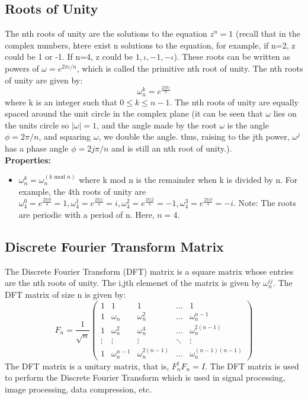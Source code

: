 \documentclass[12pt, oneside]{book}
\theoremstyle{definition}
\theoremstyle{definition}
\theoremstyle{remark}
\begin{document}
\subsection{Roots of Unity}\label{subsec:roots_of_unity}
The nth roots of unity are the solutions to the equation $z^n=1$ (recall that in the complex numbers, htere exist n solutions to the equation, for example, 
if n=2, z could be 1 or -1. If n=4, z could be $1, \iota,-1,-\iota$). These roots can be written as powers of $\omega=e^{2\pi\iota/n}$, which is called the primitive nth root of unity.
The nth roots of unity are given by:
\[ \omega^k_n=e^{\frac{2\pi k \iota}{n}} \]
where k is an integer such that $0\leq k \leq n-1$. The nth roots of unity are equally spaced around the unit circle in the complex plane (it can be seen that $\omega$ lies on the units circle so $|\omega|=1$,
and the angle made by the root $\omega$ is the angle $\phi=2\pi/n$, and squaring $\omega$, we double the angle. thus, raising to the jth power, $\omega^j$ has a phase angle $\phi=2j\pi/n$ and is still an nth root of unity.).\\
\textbf{Properties: }
\begin{itemize}
    \item $\omega^k_n=\omega_n^{(k\text{ mod }n)}$ where k mod n is the remainder when k is divided by n.
    For example, the 4th roots of unity are $\omega_4^0=e^{\frac{2\pi\iota 0}{4}}=1, \omega_4^1=e^{\frac{2\pi\iota 1}{4}}=i, \omega_4^2=e^{\frac{2\pi\iota 2}{4}}=-1, \omega_4^3=e^{\frac{2\pi\iota 3}{4}}=-i$.
    Note: The roots are periodic with a period of n. Here, $n=4$.
\end{itemize}

\subsection{Discrete Fourier Transform Matrix}
The Discrete Fourier Transform (DFT) matrix is a square matrix whose entries are the nth roots of unity. The i,jth elemenet of the matrix is given by $\omega_n^{ij}$.
The DFT matrix of size n is given by:
\[ F_n=\dfrac{1}{\sqrt{n}}\begin{pmatrix} 1 & 1 & 1 & \ldots & 1 \\ 1 & \omega_n & \omega_n^2 & \ldots & \omega_n^{n-1} \\ 1 & \omega_n^2 & \omega_n^4 & \ldots & \omega_n^{2(n-1)} \\ \vdots & \vdots & \vdots & \ddots & \vdots \\ 1 & \omega_n^{n-1} & \omega_n^{2(n-1)} & \ldots & \omega_n^{(n-1)(n-1)} \end{pmatrix} \]
The DFT matrix is a unitary matrix, that is, $F_n^{\dagger}F_n=I$. The DFT matrix is used to perform the Discrete Fourier Transform which is used in signal processing, image processing, data compression, etc.
\end{document}
